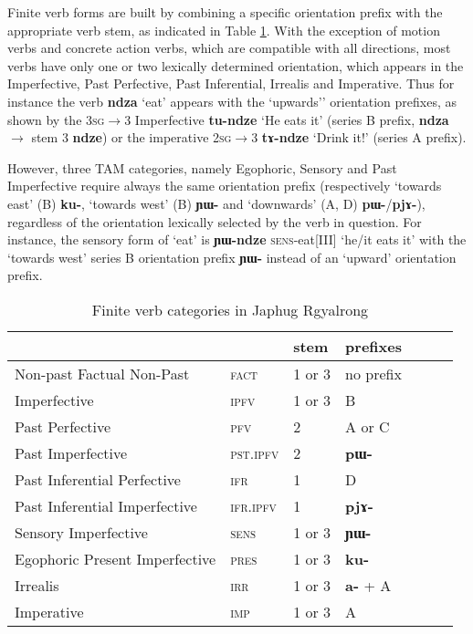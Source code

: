 \documentclass[oldfontcommands,oneside,a4paper,11pt]{article}
\newcommand{\ipa}[1]{\mbox{\phon\textbf{#1}}} %
\begin{document}
Finite verb forms are built by combining a specific orientation prefix with the appropriate verb stem, as indicated in Table \ref{tab:finite.forms}. With the exception of motion verbs and concrete action verbs, which are compatible with all directions, most verbs have only one or two lexically determined orientation, which appears in the Imperfective, Past Perfective, Past Inferential, Irrealis and Imperative. Thus for  instance the verb \ipa{ndza} `eat' appears with the `upwards'' orientation prefixes, as shown by the \textsc{3sg$\rightarrow$3} Imperfective \ipa{tu-ndze} `He eats it' (series B prefix, \ipa{ndza} $\rightarrow$ stem 3 \ipa{ndze}) or the imperative \textsc{2sg$\rightarrow$3} \ipa{tɤ-ndze} `Drink it!' (series A prefix).

However, three TAM categories, namely Egophoric, Sensory and Past Imperfective require always the same orientation prefix (respectively `towards east' (B) \ipa{ku-}, `towards west' (B) \ipa{ɲɯ-} and `downwards' (A, D) \ipa{pɯ-}/\ipa{pjɤ-}), regardless of the orientation lexically selected by the verb in question. For instance, the sensory form of `eat' is \ipa{ɲɯ-ndze} \textsc{sens}-eat[III] `he/it eats it' with the `towards west' series B orientation prefix \ipa{ɲɯ-} instead of an `upward' orientation prefix.

\begin{table}[H]
\caption{Finite verb categories in Japhug Rgyalrong} \label{tab:finite.forms} \centering
\begin{tabular}{lllllll}
\toprule
&	&	stem&	prefixes\\
\midrule
Non-past Factual Non-Past&	\textsc{fact} &	1 or 3&	no prefix\\
Imperfective&	\textsc{ipfv} &	1 or 3&	B\\
Past Perfective &	\textsc{pfv} &	2&	A or C\\
Past Imperfective &	\textsc{pst.ipfv} &	2&	\ipa{pɯ-}\\
Past Inferential Perfective &	\textsc{ifr} &	1&	D\\
Past Inferential Imperfective&	\textsc{ifr.ipfv} &	1&	\ipa{pjɤ-}\\
Sensory Imperfective&	\textsc{sens} &	1 or 3&	\ipa{ɲɯ-}\\
Egophoric Present Imperfective&	\textsc{pres} &	1 or 3&	\ipa{ku-}\\
Irrealis&	\textsc{irr} &	1 or 3&	\ipa{a-} + A\\
Imperative&	\textsc{imp} &	1 or 3&	A\\
\bottomrule
\end{tabular}
\end{table}
\end{document}
